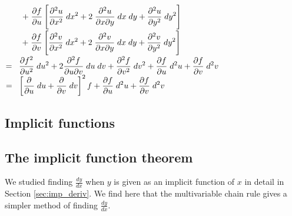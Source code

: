 \begin{example}
\begin{enumerate}
\begin{enumerate}
\begin{tabbing}
\>$ \hspace{0.7cm} + \; \displaystyle\frac{\partial f}{\partial u} \left[\displaystyle\frac{\partial^2 u}{\partial x^2} \; dx^2+ 2 \; \displaystyle\frac{\partial^2 u}{\partial x \partial y} \; dx \; dy +\displaystyle\frac{\partial^2 u}{\partial y^2} \; dy^2\right ] $\\[0.18cm] 
\>$ \hspace{0.7cm} + \;\displaystyle\frac{\partial f}{\partial v} \left[\displaystyle\frac{\partial^2 v}{\partial x^2} \; dx^2
+ 2 \; \displaystyle\frac{\partial^2 v}{\partial x \partial y} \; dx \; dy +\displaystyle\frac{\partial^2 v}{\partial y^2} \; dy^2
\right ]$\\[0.18cm]
\>$ = \;\; \displaystyle\frac{\partial f^2}{\partial u^2} \; du^2 + 2 \displaystyle\frac{\partial^2 f}{\partial u \partial v}  \;   du \; dv + \displaystyle\frac{\partial^2 f}{\partial v^2} \; dv^2 +  \displaystyle\frac{\partial f}{\partial u} \; d^2 u +\displaystyle\frac{\partial f}{\partial v}  \; d^2 v$\\[0.18cm]
\>$ = \;\; \left[\displaystyle\frac{\partial }{\partial u } \; du +  \displaystyle\frac{\partial }{\partial v} \; dv \right]^2 f
+  \displaystyle\frac{\partial f}{\partial u} \; d^2 u +\displaystyle\frac{\partial f}{\partial v}  \; d^2 v$
\end{tabbing}
\end{enumerate}
\end{enumerate}

\end{example}



\fi

\ifcalculus\subsection{Implicit functions}\fi
\ifanalysis\subsection{The implicit function theorem}\fi
	\checkoddpage
{}
We studied finding $\frac{dy}{dx}$ when $y$ is given as an implicit function of $x$ in detail in Section \ref{sec:imp_deriv}. We find here that the multivariable chain rule gives a simpler method of finding $\frac{dy}{dx}$.

